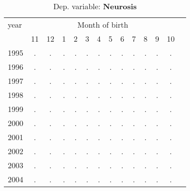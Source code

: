  \begin{table}[H] \begin{threeparttable} \centering \caption{Dep. variable: \textbf{Neurosis}} {\def\sym#1{\ifmmode^{#1}\else\(^{#1}\)\fi} \begin{tabular}{l*{13}{c}} \toprule year & \multicolumn{12}{c}{Month of birth} \\ \cmidrule(lr){2-13} 
            &          11&          12&           1&           2&           3&           4&           5&           6&           7&           8&           9&          10\\
1995        &           .&           .&           .&           .&           .&           .&           .&           .&           .&           .&           .&           .\\
1996        &           .&           .&           .&           .&           .&           .&           .&           .&           .&           .&           .&           .\\
1997        &           .&           .&           .&           .&           .&           .&           .&           .&           .&           .&           .&           .\\
1998        &           .&           .&           .&           .&           .&           .&           .&           .&           .&           .&           .&           .\\
1999        &           .&           .&           .&           .&           .&           .&           .&           .&           .&           .&           .&           .\\
2000        &           .&           .&           .&           .&           .&           .&           .&           .&           .&           .&           .&           .\\
2001        &           .&           .&           .&           .&           .&           .&           .&           .&           .&           .&           .&           .\\
2002        &           .&           .&           .&           .&           .&           .&           .&           .&           .&           .&           .&           .\\
2003        &           .&           .&           .&           .&           .&           .&           .&           .&           .&           .&           .&           .\\
2004        &           .&           .&           .&           .&           .&           .&           .&           .&           .&           .&           .&           .\\

\end{tabular}}
\end{threeparttable}
\end{table}
